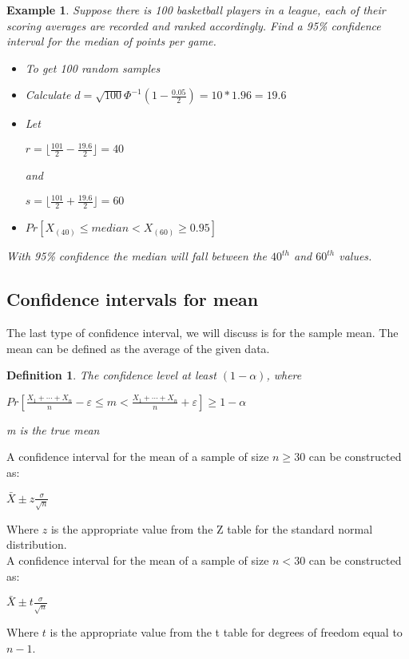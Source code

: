 \documentclass[11pt,a4paper]{article}
\theoremstyle{plain}
\newtheorem{de}[fact]{Definition}
\newtheorem{exmp}[fact]{Example}
\begin{document}
\begin{exmp}
Suppose there is 100 basketball players in a league, each of their scoring averages are recorded and ranked accordingly. Find a 95\% confidence interval for the median of points per game.
\begin{itemize}
  \item To get 100 random samples
  \item Calculate $d=\sqrt{100}\Phi^{-1}(1-\frac{0.05}{2})=10*1.96=19.6$
  \item Let
  \begin{center}
  $r=\lfloor\frac{101}{2}-\frac{19.6}{2}\rfloor=40$
  \end{center}
  and
  \begin{center}
  $s=\lfloor\frac{101}{2}+\frac{19.6}{2}\rfloor=60$
  \end{center}
  \item $Pr[X_{(40)}\leq median < X_{(60)} \geq 0.95]$
\end{itemize}
With 95\% confidence the median will fall between the $40^{th}$ and $60^{th}$ values.

\end{exmp}


\subsection*{Confidence intervals for mean}
The last type of confidence interval, we will discuss is for the sample mean. The mean can be defined as the average of the given data. 
\begin{de}
The confidence level at least $(1-\alpha)$, where
\begin{center}
$Pr[\frac{X_1+\cdots+X_n}{n}- \varepsilon \leq m < \frac{X_1+\cdots+X_n}{n}+ \varepsilon]\geq 1-\alpha$
\end{center}
m is the true mean
\end{de}

A confidence interval for the mean of a sample of size $n \geq 30$ can be constructed as:
\begin{center}
$\bar{X}\pm z\frac{\sigma}{\sqrt{n}}$
\end{center}
Where $z$ is the appropriate value from the Z table for the standard normal distribution.\\



A confidence interval for the mean of a sample of size $n < 30$ can be constructed as:
\begin{center}
$\bar{X}\pm t\frac{\sigma}{\sqrt{n}}$
\end{center}
Where $t$ is the appropriate value from the t table for degrees of freedom equal to $n-1$.
\end{document}
